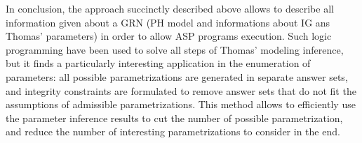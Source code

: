 In conclusion, the approach succinctly described above allows to describe all information given about a GRN (PH model and informations about IG ans Thomas' parameters) in order to allow ASP programs execution. Such logic programming have been used to solve all steps of Thomas' modeling inference, but it finds a particularly interesting application in the enumeration of parameters: all possible parametrizations are generated in separate answer sets, and integrity constraints are formulated to remove answer sets that do not fit the assumptions of admissible parametrizations. This method allows to efficiently use the parameter inference results to cut the number of possible parametrization, and reduce the number of interesting parametrizations to consider in the end.
